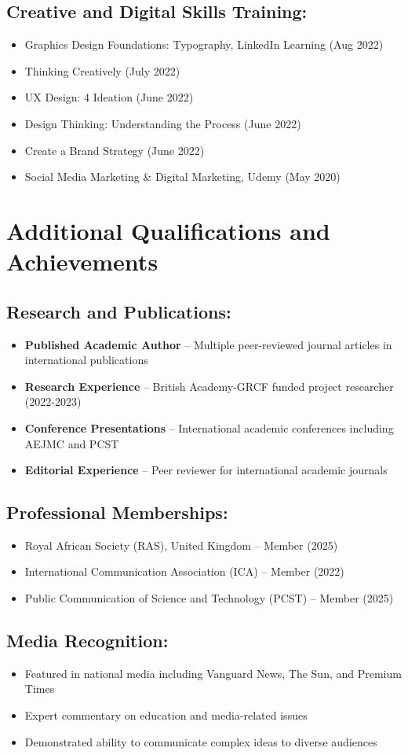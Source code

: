 \documentclass[a4paper,11pt]{article}
\newcommand{\resumeItem}[1]{
  \item\small{
    {#1 \vspace{-2pt}}
  }
}
\newcommand{\resumeItemListStart}{\begin{itemize}}
\newcommand{\resumeItemListEnd}{\end{itemize}\vspace{-5pt}}
\begin{document}
\subsection{Creative and Digital Skills Training:}
    \resumeItemListStart
        \resumeItem{Graphics Design Foundations: Typography, LinkedIn Learning (Aug 2022)}
        \resumeItem{Thinking Creatively (July 2022)}
        \resumeItem{UX Design: 4 Ideation (June 2022)}
        \resumeItem{Design Thinking: Understanding the Process (June 2022)}
        \resumeItem{Create a Brand Strategy (June 2022)}
        \resumeItem{Social Media Marketing \& Digital Marketing, Udemy (May 2020)}
    \resumeItemListEnd


\section{Additional Qualifications and Achievements}
\subsection{Research and Publications:}
    \resumeItemListStart
        \resumeItem{\textbf{Published Academic Author} -- Multiple peer-reviewed journal articles in international publications}
        \resumeItem{\textbf{Research Experience} -- British Academy-GRCF funded project researcher (2022-2023)}
        \resumeItem{\textbf{Conference Presentations} -- International academic conferences including AEJMC and PCST}
        \resumeItem{\textbf{Editorial Experience} -- Peer reviewer for international academic journals}
    \resumeItemListEnd

\subsection{Professional Memberships:}
    \resumeItemListStart
        \resumeItem{Royal African Society (RAS), United Kingdom -- Member (2025)}
        \resumeItem{International Communication Association (ICA) -- Member (2022)}
        \resumeItem{Public Communication of Science and Technology (PCST) -- Member (2025)}
    \resumeItemListEnd

\subsection{Media Recognition:}
    \resumeItemListStart
        \resumeItem{Featured in national media including Vanguard News, The Sun, and Premium Times}
        \resumeItem{Expert commentary on education and media-related issues}
        \resumeItem{Demonstrated ability to communicate complex ideas to diverse audiences}
    \resumeItemListEnd
\end{document}
